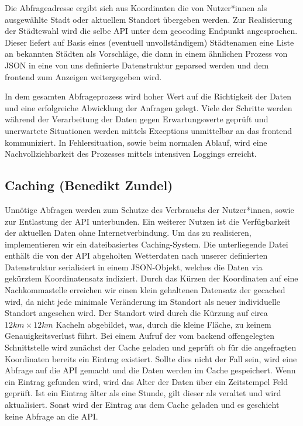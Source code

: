 \documentclass{article}
\begin{document}
Die Abfrageadresse ergibt sich aus Koordinaten die von Nutzer*innen als ausgewählte Stadt oder aktuellem Standort übergeben werden. Zur Realisierung der Städtewahl wird die selbe API unter dem geocoding Endpunkt angesprochen. Dieser liefert auf Basis eines (eventuell unvollständigem) Städtenamen eine Liste an bekannten Städten als Vorschläge, die dann in einem ähnlichen Prozess von JSON in eine von uns definierte Datenstruktur geparsed werden und dem frontend zum Anzeigen weitergegeben wird.

In dem gesamten Abfrageprozess wird hoher Wert auf die Richtigkeit der Daten und eine erfolgreiche Abwicklung der Anfragen gelegt. Viele der Schritte werden während der Verarbeitung der Daten gegen Erwartungswerte geprüft und unerwartete Situationen werden mittels Exceptions unmittelbar an das frontend kommuniziert. In Fehlersituation, sowie beim normalen Ablauf, wird eine Nachvollziehbarkeit des Prozesses mittels intensiven Loggings erreicht.

\subsection{Caching \small{(Benedikt Zundel)}}
Unnötige Abfragen werden zum Schutze des Verbrauchs der Nutzer*innen, sowie zur Entlastung der API unterbunden. Ein weiterer Nutzen ist die Verfügbarkeit der aktuellen Daten ohne Internetverbindung. Um das zu realisieren, implementieren wir ein dateibasiertes Caching-System. Die unterliegende Datei enthält die von der API abgeholten Wetterdaten nach unserer definierten Datenstruktur serialisiert in einem JSON-Objekt, welches die Daten via gekürztem Koordinatensatz indiziert. Durch das Kürzen der Koordinaten auf eine Nachkommastelle erreichen wir einen klein gehaltenen Datensatz der gecached wird, da nicht jede minimale Veränderung im Standort als neuer individuelle Standort angesehen wird. Der Standort wird durch die Kürzung auf circa $ 12 km \times 12 km $ Kacheln abgebildet, was, durch die kleine Fläche, zu keinem Genauigkeitsverlust führt.
Bei einem Aufruf der vom backend offengelegten Schnittstelle wird zunächst der Cache geladen und geprüft ob für die angefragten Koordinaten bereits ein Eintrag existiert. Sollte dies nicht der Fall sein, wird eine Abfrage auf die API gemacht und die Daten werden im Cache gespeichert. Wenn ein Eintrag gefunden wird, wird das Alter der Daten über ein Zeitstempel Feld geprüft. Ist ein Eintrag älter als eine Stunde, gilt dieser als veraltet und wird aktualisiert. Sonst wird der Eintrag aus dem Cache geladen und es geschieht keine Abfrage an die API.
\end{document}
